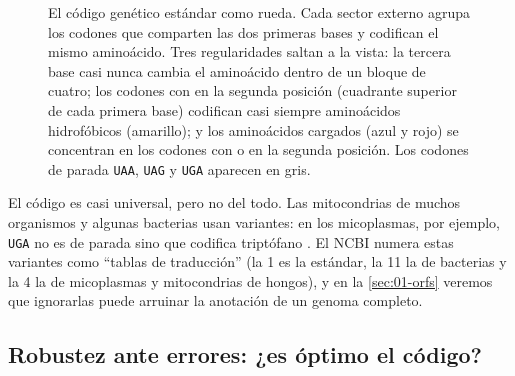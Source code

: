 \begin{figure}[t]
\centering
{}
\caption[La rueda del código genético estándar]{El código genético estándar como rueda. Cada sector externo agrupa los codones que comparten las dos primeras bases y codifican el mismo aminoácido. Tres regularidades saltan a la vista: la tercera base casi nunca cambia el aminoácido dentro de un bloque de cuatro; los codones con  en la segunda posición (cuadrante superior de cada primera base) codifican casi siempre aminoácidos hidrofóbicos (amarillo); y los aminoácidos cargados (azul y rojo) se concentran en los codones con  o  en la segunda posición. Los codones de parada \texttt{UAA}, \texttt{UAG} y \texttt{UGA} aparecen en gris.}
\label{fig:01-rueda}
\end{figure}

El código es casi universal, pero no del todo. Las mitocondrias de muchos organismos y algunas bacterias usan variantes: en los micoplasmas, por ejemplo, \texttt{UGA} no es de parada sino que codifica triptófano \parencite{c01-yamao1985}. El NCBI numera estas variantes como ``tablas de traducción'' (la 1 es la estándar, la 11 la de bacterias y la 4 la de micoplasmas y mitocondrias de hongos), y en la \cref{sec:01-orfs} veremos que ignorarlas puede arruinar la anotación de un genoma completo.

\subsection{Robustez ante errores: ¿es óptimo el código?}

